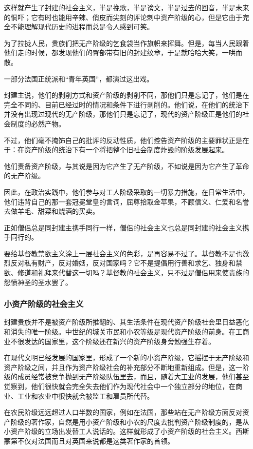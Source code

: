 \documentclass[10pt, UTF8]{book} %
\begin{document}
这样就产生了封建的社会主义，半是挽歌，半是谤文，半是过去的回音，半是未来的恫吓；它有时也能用辛辣、俏皮而尖刻的评论刺中资产阶级的心，但是它由于完全不能理解现代历史的进程而总是令人感到可笑。

为了拉拢人民，贵族们把无产阶级的乞食袋当作旗帜来挥舞。但是，每当人民跟着他们走的时候，都发现他们的臀部带有旧的封建纹章，于是就哈哈大笑，一哄而散。

一部分法国正统派和“青年英国”，都演过这出戏。

封建主说，他们的剥削方式和资产阶级的剥削不同，那他们只是忘记了，他们是在完全不同的、目前已经过时的情况和条件下进行剥削的。他们说，在他们的统治下并没有出现过现代的无产阶级，那他们只是忘记了，现代的资产阶级正是他们的社会制度的必然产物。

不过，他们毫不掩饰自己的批评的反动性质，他们控告资产阶级的主要罪状正是在于：在资产阶级的统治下有一个将把整个旧社会制度炸毁的阶级发展起来。

他们责备资产阶级，与其说是因为它产生了无产阶级，不如说是因为它产生了革命的无产阶级。

因此，在政治实践中，他们参与对工人阶级采取的一切暴力措施，在日常生活中，他们违背自己的那一套冠冕堂皇的言词，屈尊拾取金苹果，不顾信义、仁爱和名誉去做羊毛、甜菜和烧酒的买卖。

正如僧侣总是同封建主携手同行一样，僧侣的社会主义也总是同封建的社会主义携手同行的。

要给基督教禁欲主义涂上一层社会主义的色彩，是再容易不过了。基督教不是也激烈反对私有财产，反对婚姻，反对国家吗？它不是提倡用行善和求乞、独身和禁欲、修道和礼拜来代替这一切吗？基督教的社会主义，只不过是僧侣用来使贵族的怨愤神圣的圣水罢了。

\subsubsection{小资产阶级的社会主义}

封建贵族并不是被资产阶级所推翻的、其生活条件在现代资产阶级社会里日益恶化和消失的唯一阶级。中世纪的城关市民和小农等级是现代资产阶级的前身。在工商业不很发达的国家里，这个阶级还在新兴的资产阶级身旁勉强生存着。

在现代文明已经发展的国家里，形成了一个新的小资产阶级，它摇摆于无产阶级和资产阶级之间，并且作为资产阶级社会的补充部分不断地重新组成。但是，这一阶级的成员经常被竞争抛到无产阶级队伍里去，而且，随着大工业的发展，他们甚至觉察到，他们很快就会完全失去他们作为现代社会中一个独立部分的地位，在商业、工业和农业中很快就会被监工和雇员所代替。

在农民阶级远远超过人口半数的国家，例如在法国，那些站在无产阶级方面反对资产阶级的著作家，自然是用小资产阶级和小农的尺度去批判资产阶级制度的，是从小资产阶级的立场出发替工人说话的。这样就形成了小资产阶级的社会主义。西斯蒙第不仅对法国而且对英国来说都是这类著作家的首领。
\end{document}
